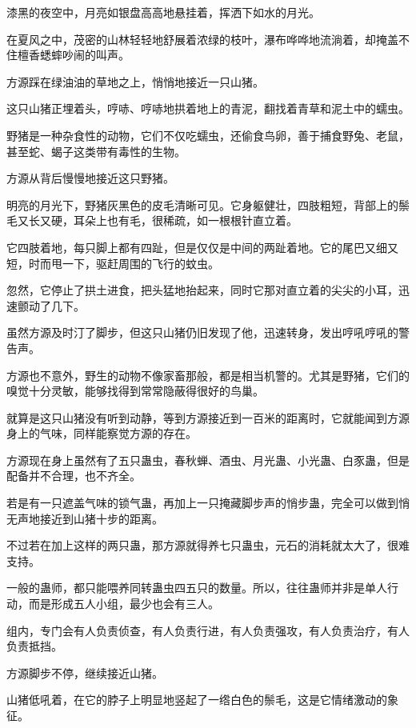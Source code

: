 
\begin{this_body}

漆黑的夜空中，月亮如银盘高高地悬挂着，挥洒下如水的月光。

在夏风之中，茂密的山林轻轻地舒展着浓绿的枝叶，瀑布哗哗地流淌着，却掩盖不住檀香蟋蟀吵闹的叫声。

方源踩在绿油油的草地之上，悄悄地接近一只山猪。

这只山猪正埋着头，哼哧、哼哧地拱着地上的青泥，翻找着青草和泥土中的蠕虫。

野猪是一种杂食性的动物，它们不仅吃蠕虫，还偷食鸟卵，善于捕食野兔、老鼠，甚至蛇、蝎子这类带有毒性的生物。

方源从背后慢慢地接近这只野猪。

明亮的月光下，野猪灰黑色的皮毛清晰可见。它身躯健壮，四肢粗短，背部上的鬃毛又长又硬，耳朵上也有毛，很稀疏，如一根根针直立着。

它四肢着地，每只脚上都有四趾，但是仅仅是中间的两趾着地。它的尾巴又细又短，时而甩一下，驱赶周围的飞行的蚊虫。

忽然，它停止了拱土进食，把头猛地抬起来，同时它那对直立着的尖尖的小耳，迅速颤动了几下。

虽然方源及时汀了脚步，但这只山猪仍旧发现了他，迅速转身，发出哼吼哼吼的警告声。

方源也不意外，野生的动物不像家畜那般，都是相当机警的。尤其是野猪，它们的嗅觉十分灵敏，能够找得到常常隐蔽得很好的鸟巢。

就算是这只山猪没有听到动静，等到方源接近到一百米的距离时，它就能闻到方源身上的气味，同样能察觉方源的存在。

方源现在身上虽然有了五只蛊虫，春秋蝉、酒虫、月光蛊、小光蛊、白豕蛊，但是配备并不合理，也不齐全。

若是有一只遮盖气味的锁气蛊，再加上一只掩藏脚步声的悄步蛊，完全可以做到悄无声地接近到山猪十步的距离。

不过若在加上这样的两只蛊，那方源就得养七只蛊虫，元石的消耗就太大了，很难支持。

一般的蛊师，都只能喂养同转蛊虫四五只的数量。所以，往往蛊师并非是单人行动，而是形成五人小组，最少也会有三人。

组内，专门会有人负责侦查，有人负责行进，有人负责强攻，有人负责治疗，有人负责抵挡。

方源脚步不停，继续接近山猪。

山猪低吼着，在它的脖子上明显地竖起了一绺白色的鬃毛，这是它情绪激动的象征。


\end{this_body}
